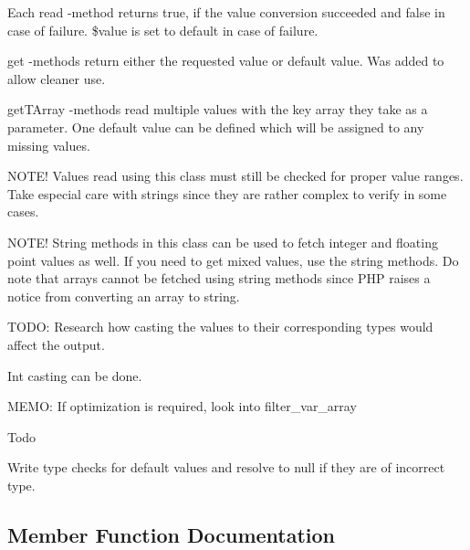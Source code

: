 Each read -\/method returns true, if the value conversion succeeded and false in case of failure. \$value is set to default in case of failure.

get -\/methods return either the requested value or default value. Was added to allow cleaner use.

get\+T\+Array -\/methods read multiple values with the key array they take as a parameter. One default value can be defined which will be assigned to any missing values.

N\+O\+T\+E! Values read using this class must still be checked for proper value ranges. Take especial care with strings since they are rather complex to verify in some cases.

N\+O\+T\+E! String methods in this class can be used to fetch integer and floating point values as well. If you need to get mixed values, use the string methods. Do note that arrays cannot be fetched using string methods since P\+HP raises a notice from converting an array to string.

T\+O\+DO\+: Research how casting the values to their corresponding types would affect the output.
\begin{DoxyItemize}
\item Int casting can be done.
\end{DoxyItemize}

M\+E\+MO\+: If optimization is required, look into filter\+\_\+var\+\_\+array



\begin{DoxyRefDesc}{Todo}
\item[\hyperlink{todo__todo000004}{Todo}]Write type checks for default values and resolve to null if they are of incorrect type. \end{DoxyRefDesc}


\subsection{Member Function Documentation}
\mbox{\label{class_request_data_aad8cc8d83c11936ce64f708392057942}} 
